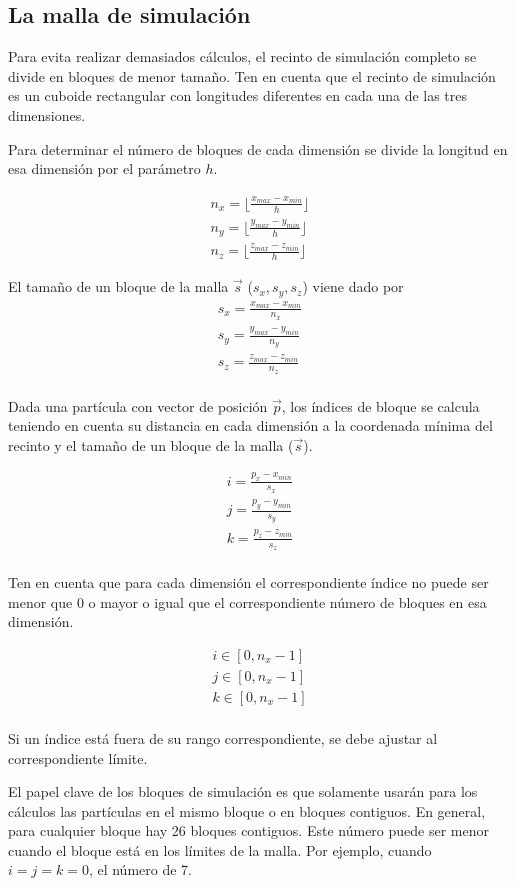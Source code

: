 \subsection{La malla de simulación}

Para evita realizar demasiados cálculos, el recinto de simulación completo se
divide en bloques de menor tamaño. Ten en cuenta que el recinto de simulación es
un cuboide rectangular con longitudes diferentes en cada una de las tres
dimensiones.

Para determinar el número de bloques de cada dimensión se divide la longitud en
esa dimensión por el parámetro $h$.

\[
\begin{split}
n_x = \lfloor \frac{x_{max}- x_{min}}{h} \rfloor\\
n_y = \lfloor \frac{y_{max}- y_{min}}{h} \rfloor\\
n_z = \lfloor \frac{z_{max}- z_{min}}{h} \rfloor
\end{split}
\]

El tamaño de un bloque de la malla $\vec{s}$ ($s_x, s_y, s_z$) viene dado por
\[
\begin{split}
s_x = \frac{x_{max} - x_{min}}{n_x}\\
s_y = \frac{y_{max} - y_{min}}{n_y}\\
s_z = \frac{z_{max} - z_{min}}{n_z}\\
\end{split}
\] 

Dada una partícula con vector de posición $\vec{p}$, los índices de bloque se
calcula teniendo en cuenta su distancia en cada dimensión a la coordenada mínima
del recinto y el tamaño de un bloque de la malla ($\vec{s}$).

\[
\begin{split}
i = \frac{p_x - x_{min}}{s_x}\\
j = \frac{p_y - y_{min}}{s_y}\\
k = \frac{p_z - z_{min}}{s_z}\\
\end{split}
\]

Ten en cuenta que para cada dimensión el correspondiente índice no puede ser
menor que $0$ o mayor o igual que el correspondiente número de bloques en esa
dimensión.

\[
\begin{split}
i \in [0, n_x-1]\\
j \in [0, n_x-1]\\
k \in [0, n_x-1]\\
\end{split}
\]

Si un índice está fuera de su rango correspondiente, se debe ajustar al
correspondiente límite.

El papel clave de los bloques de simulación es que solamente usarán para los
cálculos las partículas en el mismo bloque o en bloques contiguos. En general,
para cualquier bloque hay 26 bloques contiguos. Este número puede ser menor
cuando el bloque está en los límites de la malla. Por ejemplo, cuando $i=j=k=0$,
el número de 7.
